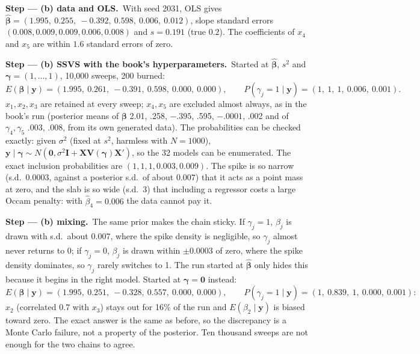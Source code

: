\documentclass[11pt,a4paper]{article}
\newcommand{\passo}[2]{\par\smallskip\noindent\textbf{Step --- #1.}~#2}
\begin{document}
\begin{sol}
\passo{(b) data and OLS}{With seed 2031, OLS gives $\hat{\bm\beta}=(1.995,\ 0.255,\ -0.392,\ 0.598,\ 0.006,\ 0.012)$, slope standard errors
$(0.008,0.009,0.009,0.006,0.008)$ and $s=0.191$ (true $0.2$). The coefficients of $x_4$ and $x_5$ are within $1.6$ standard errors of zero.}

\passo{(b) SSVS with the book's hyperparameters}{Started at $\hat{\bm\beta}$, $s^2$ and $\bm\gamma=(1,\dots,1)$, 10{,}000 sweeps, 200 burned:
\begin{equation}
E(\bm\beta\mid\bm y)=(1.995,\ 0.261,\ -0.391,\ 0.598,\ 0.000,\ 0.000),\qquad
P(\gamma_j=1\mid\bm y)=(1,\ 1,\ 1,\ 0.006,\ 0.001).\nonumber
\end{equation}
$x_1,x_2,x_3$ are retained at every sweep; $x_4,x_5$ are excluded almost always, as in the book's run (posterior means of $\bm\beta$
2.01, .258, $-.395$, .595, $-.0001$, .002 and of $\gamma_4,\gamma_5$ .003, .008, from its own generated data). The probabilities can
be checked exactly: given $\sigma^2$ (fixed at $s^2$, harmless with $N=1000$), $\bm y\mid\bm\gamma\sim N(\bm0,\sigma^2\bm I+\bm X\bm V(\bm\gamma)\bm X')$,
so the 32 models can be enumerated. The exact inclusion probabilities are $(1,1,1,0.003,0.009)$. The spike is so narrow (s.d.\
$0.0003$, against a posterior s.d.\ of about $0.007$) that it acts as a point mass at zero, and the slab is so wide (s.d.\ 3) that
including a regressor costs a large Occam penalty: with $\hat\beta_4=0.006$ the data cannot pay it.}

\passo{(b) mixing}{The same prior makes the chain sticky. If $\gamma_j=1$, $\beta_j$ is drawn with s.d.\ about $0.007$, where the
spike density is negligible, so $\gamma_j$ almost never returns to 0; if $\gamma_j=0$, $\beta_j$ is drawn within $\pm0.0003$ of zero,
where the spike density dominates, so $\gamma_j$ rarely switches to 1. The run started at $\hat{\bm\beta}$ only hides this because
it begins in the right model. Started at $\bm\gamma=\bm0$ instead:
\begin{equation}
E(\bm\beta\mid\bm y)=(1.995,\ 0.251,\ -0.328,\ 0.557,\ 0.000,\ 0.000),\qquad
P(\gamma_j=1\mid\bm y)=(1,\ 0.839,\ 1,\ 0.000,\ 0.001):\nonumber
\end{equation}
$x_2$ (correlated $0.7$ with $x_3$) stays out for 16\% of the run and $E(\beta_2\mid\bm y)$ is biased toward zero. The exact answer is
the same as before, so the discrepancy is a Monte Carlo failure, not a property of the posterior. Ten thousand sweeps are not enough for
the two chains to agree.}


\end{sol}
\end{document}
